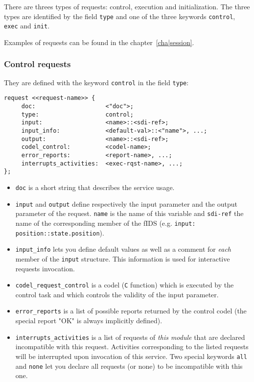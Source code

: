 There     are  threes   types of      requests:  control, execution   and
initialization. The three types are  identified  by the field {\tt  type}
and one of the three keywords {\tt control}, {\tt exec} and {\tt init}.

Examples of requests can be found in the chapter~\ref{cha|session}.

\subsubsection{Control requests}

They are defined with the keyword {\tt control} in the field {\tt type}:

\begin{center}\begin{cartouche}\small\begin{verbatim}
request <<request-name>> {
     doc:                    <"doc">;
     type:                   control;
     input:                  <name>::<sdi-ref>;
     input_info:             <default-val>::<"name">, ...;
     output:                 <name>::<sdi-ref>;
     codel_control:          <codel-name>;
     error_reports:          <report-name>, ...;
     interrupts_activities:  <exec-rqst-name>, ...;
};
\end{verbatim}\end{cartouche}\end{center}

\begin{itemize}
\item {\tt doc} is a short string that describes the service usage.

\item {\tt input} and {\tt output} define respectively the input
parameter and the output parameter of the request. {\tt name} is the name
of this variable and  {\tt sdi-ref} the name  of the corresponding member
of the fIDS (e.g. {\tt input: position::state.position}).

\item {\tt input\_info} lets you define default values as well as a
comment for {\em  each}   member  of  the  {\tt  input}  structure.  This
information is used for interactive  requests invocation.

\item {\tt codel\_request\_control} is a codel ({\tt C} function) which is
executed by the control task and which controls the validity of the input
parameter.

\item {\tt error\_reports} is a list of possible reports returned by the
control codel (the special report "OK" is always implicitly defined).

\item {\tt interrupts\_activities} is a list of requests of {\em this module}
that   are    declared   incompatible  with     this request.  Activities
corresponding to the listed requests will  be interrupted upon invocation
of this service.  Two special keywords {\tt  all} and {\tt none} let  you
declare all requests (or none) to be incompatible with this one.
\end{itemize}


